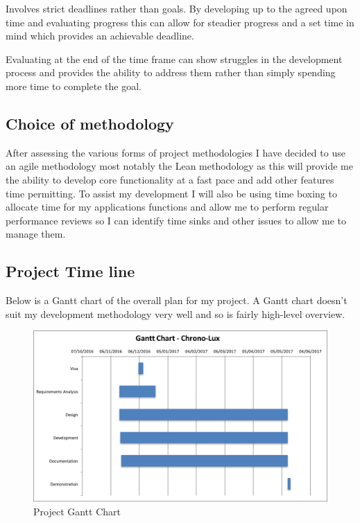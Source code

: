 Involves strict deadlines rather than goals. By developing up to the
agreed upon time and evaluating progress this can allow for steadier
progress and a set time in mind which provides an achievable deadline.

Evaluating at the end of the time frame can show struggles in the
development process and provides the ability to address them rather than
simply spending more time to complete the goal.

\subsection{Choice of methodology}\label{choice-of-methodology}

After assessing the various forms of project methodologies I have
decided to use an agile methodology most notably the Lean methodology as
this will provide me the ability to develop core functionality at a fast
pace and add other features time permitting. To assist my development I
will also be using time boxing to allocate time for my applications
functions and allow me to perform regular performance reviews so I can
identify time sinks and other issues to allow me to manage them.

\subsection{Project Time line}\label{project-time-line}

Below is a Gantt chart of the overall plan for my project. A Gantt chart
doesn't suit my development methodology very well and so is fairly
high-level overview.

\begin{landscape}
\begin{figure}[htbp]
\includegraphics{Images/gantt.png}
\caption{Project Gantt Chart}
\end{figure}
\end{landscape}
